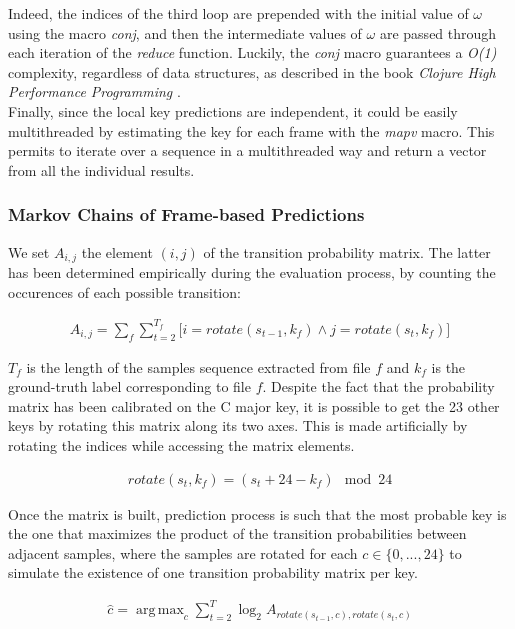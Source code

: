 \documentclass[letterpaper]{article}
\DeclareMathOperator*{\argmax}{arg\,max}
\begin{document}
Indeed, the indices of the third loop are prepended with the initial value of $\omega$ using the macro \textit{conj}, and then the intermediate values of $\omega$ are passed through each iteration of the \textit{reduce} function. Luckily, the \textit{conj} macro guarantees a \textit{O(1)} complexity, regardless of data structures, as described in the book \textit{Clojure High Performance Programming} \citep{SK}. \\

Finally, since the local key predictions are independent, it could be easily multithreaded by estimating the key for each frame with the \textit{mapv} macro. This permits to iterate over a sequence in a multithreaded way and return a vector from all the individual results.


\subsubsection{Markov Chains of Frame-based Predictions}
\label{sssec:A}

We set $A_{i, j}$ the element $(i, j)$ of the transition probability matrix. The latter has been determined empirically during the evaluation process, by counting the occurences of each possible transition:

\begin{align}
A_{i, j} = \sum_f \sum_{t=2}^{T_f} \big[ i=rotate(s_{t-1}, k_f) \wedge j=rotate(s_t, k_f) \big]
\label{MIJ}
\end{align}

$T_f$ is the length of the samples sequence extracted from file $f$ and $k_f$ is the ground-truth label corresponding to file $f$.
Despite the fact that the probability matrix has been calibrated on the C major key, it is possible to get the 23 other keys by rotating this matrix along its two axes.
This is made artificially by rotating the indices while accessing the matrix elements.

\begin{align}
rotate(s_t, k_f) = (s_t + 24 - k_f) \mod 24
\label{rotate}
\end{align}


Once the matrix is built, prediction process is such that the most probable key is the one that maximizes the product of the transition probabilities between adjacent samples, 
where the samples are rotated for each $c \in \{0, ..., 24\}$ to simulate the existence of one transition probability matrix per key.

\begin{align}
\hat{c} = \argmax_c \sum_{t=2}^{T} \log_2 A_{rotate(s_{t-1}, c), rotate(s_{t}, c)}
\label{logprobaclojure}
\end{align}
\end{document}
